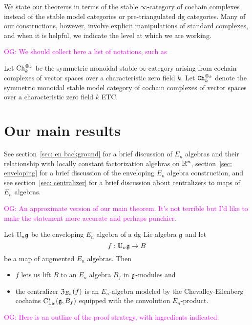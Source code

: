 \documentclass[11pt]{amsart}
\numberwithin{equation}{section}
\def\owen{\textcolor{magenta}{OG: }\textcolor{magenta}}
\begin{document}
\begin{rmk}
We state our theorems in terms of the stable $\infty$-category of cochain complexes 
instead of the stable model categories or pre-triangulated dg categories. 
Many of our constructions, however, involve explicit manipulations of standard complexes, 
and when it is helpful, we indicate the level at which we are working.
\end{rmk}

\owen{We should collect here a list of notations, such as}

Let ${\rm Ch}_k^{\otimes_k}$ be the symmetric monoidal stable $\infty$-category arising from cochain complexes of vector spaces over a characteristic zero field $k$.
Let ${\tt Ch}_k^{\otimes_k}$ denote the symmetric monoidal stable model category of cochain complexes of vector spaces over a characteristic zero field $k$ ETC.

\section{Our main results}

See section~\ref{sec: en background} for a brief discussion of $E_n$ algebras and their relationship with locally constant factorization algebras on $\mathbb R^n$, section~\ref{sec: enveloping} for a brief discussion of the enveloping $E_n$ algebra construction, and see section~\ref{sec: centralizer} 
for a brief discussion about centralizers to maps of $E_n$ algebras.

\owen{An approximate version of our main theorem. It's not terrible but I'd like to make the statement more accurate and perhaps punchier.}

\begin{thm}
\label{thm: centralizer}
Let $\mathbb U_n \mathfrak g$ be the enveloping $E_n$ algebra of a dg Lie algebra $\mathfrak g$ and let 
\[
f: \mathbb U_n \mathfrak g \to B
\]
be a map of augmented $E_n$ algebras.
Then
\begin{itemize}
\item $f$ lets us lift $B$ to an $E_n$ algebra $B_f$ in $\mathfrak g$-modules and
\item the centralizer ${\frak Z}_{E_n}(f)$ is an $E_n$-algebra modeled by the Chevalley-Eilenberg 
cochains ${\rm C}_{\rm Lie}^*(\mathfrak g, B_f)$ equipped with the convolution $E_n$-product.
\end{itemize}
\end{thm}

\owen{Here is an outline of the proof strategy, with ingredients indicated:}
\end{document}
